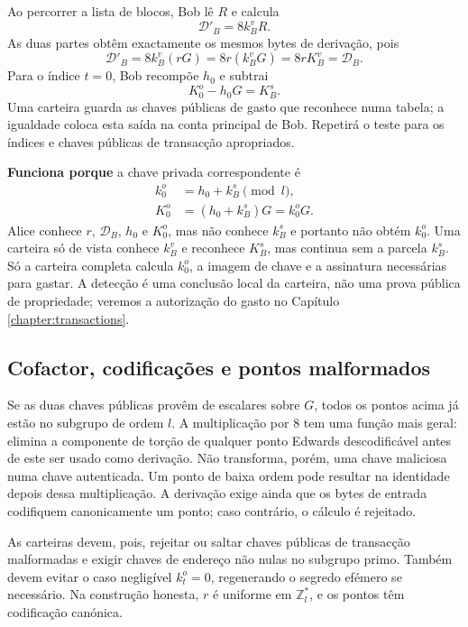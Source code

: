 %
Ao percorrer a lista de blocos, Bob lê \(R\) e calcula
\[
 \mathcal D'_B=8k_B^vR.
\]
As duas partes obtêm exactamente os mesmos bytes de derivação, pois
\[
 \mathcal D'_B=8k_B^v(rG)=8r(k_B^vG)=8rK_B^v=\mathcal D_B.
\]
Para o índice \(t=0\), Bob recompõe \(h_0\) e subtrai
\[
 K_0^o-h_0G=K_B^s.
\]
Uma carteira guarda as chaves públicas de gasto que reconhece numa tabela; a
igualdade coloca esta saída na conta principal de Bob. Repetirá o teste para
os índices e chaves públicas de transacção apropriados.

\textbf{Funciona porque} a chave privada correspondente é
\begin{align*}
 k_0^o&=h_0+k_B^s\pmod{l},\\
 K_0^o&=(h_0+k_B^s)G=k_0^oG.
\end{align*}
Alice conhece \(r\), \(\mathcal D_B\), \(h_0\) e \(K_0^o\), mas não conhece
\(k_B^s\) e portanto não obtém \(k_0^o\). Uma carteira só de vista conhece
\(k_B^v\) e reconhece \(K_B^s\), mas continua sem a parcela \(k_B^s\). Só a
carteira completa calcula \(k_0^o\), a imagem de chave e a assinatura
necessárias para gastar. A detecção é uma conclusão local da carteira, não uma
prova pública de propriedade; veremos a autorização do gasto no Capítulo
\ref{chapter:transactions}.

\subsection*{Cofactor, codificações e pontos malformados}

Se as duas chaves públicas provêm de escalares sobre \(G\), todos os pontos
acima já estão no subgrupo de ordem \(l\). A multiplicação por 8 tem uma função
mais geral: elimina a componente de torção de qualquer ponto Edwards
descodificável antes de este ser usado como derivação. Não transforma, porém,
uma chave maliciosa numa chave autenticada. Um ponto de baixa ordem pode
resultar na identidade depois dessa multiplicação. A derivação exige ainda
que os bytes de entrada codifiquem canonicamente um ponto; caso contrário,
o cálculo é rejeitado.

As carteiras devem, pois, rejeitar ou saltar chaves públicas de transacção
malformadas e exigir chaves de endereço não nulas no subgrupo primo. Também
devem evitar o caso negligível \(k_t^o=0\), regenerando o segredo efémero se
necessário. Na construção honesta, \(r\) é uniforme em \(\mathbb{Z}_l^*\), e
os pontos têm codificação canónica.

